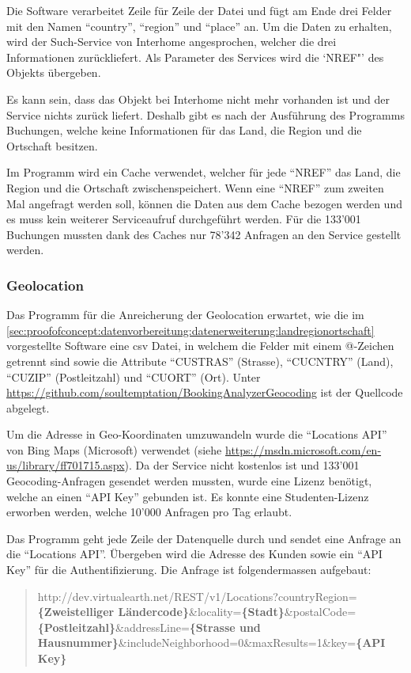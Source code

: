 Die Software verarbeitet Zeile für Zeile der Datei und fügt am Ende drei Felder mit den Namen "`country"', "`region"' und "`place"' an. Um die Daten zu erhalten, wird der Such-Service von Interhome angesprochen, welcher die drei Informationen zurückliefert. Als Parameter des Services wird die `NREF"' des Objekts übergeben. 

Es kann sein, dass das Objekt bei Interhome nicht mehr vorhanden ist und der Service nichts zurück liefert. Deshalb gibt es nach der Ausführung des Programms Buchungen, welche keine Informationen für das Land, die Region und die Ortschaft besitzen.

Im Programm wird ein Cache verwendet, welcher für jede "`NREF"' das Land, die Region und die Ortschaft zwischenspeichert. Wenn eine "`NREF"' zum zweiten Mal angefragt werden soll, können die Daten aus dem Cache bezogen werden und es muss kein weiterer Serviceaufruf durchgeführt werden. Für die 133'001 Buchungen mussten dank des Caches nur 78'342 Anfragen an den Service gestellt werden.

\subsubsection{Geolocation}
\label{sec:proofofconcept:datenvorbereitung:datenerweiterung:geolocation}
Das Programm für die Anreicherung der Geolocation erwartet, wie die im \cref{sec:proofofconcept:datenvorbereitung:datenerweiterung:landregionortschaft} vorgestellte Software eine \gls{csv} Datei, in welchem die Felder mit einem @-Zeichen getrennt sind sowie die Attribute "`CUSTRAS"' (Strasse), "`CUCNTRY"' (Land), "`CUZIP"' (Postleitzahl) und "`CUORT"' (Ort). Unter \url{https://github.com/soultemptation/BookingAnalyzerGeocoding} ist der Quellcode abgelegt. 

Um die Adresse in Geo-Koordinaten umzuwandeln wurde die "`Locations API"' von Bing Maps (Microsoft) verwendet (siehe \url{https://msdn.microsoft.com/en-us/library/ff701715.aspx}). Da der Service nicht kostenlos ist und 133'001 Geocoding-Anfragen gesendet werden mussten, wurde eine Lizenz benötigt, welche an einen "`API Key"' gebunden ist. Es konnte eine Studenten-Lizenz erworben werden, welche 10'000 Anfragen pro Tag erlaubt.

Das Programm geht jede Zeile der Datenquelle durch und sendet eine Anfrage an die "`Locations API"'. Übergeben wird die Adresse des Kunden sowie ein "`API Key"' für die Authentifizierung. Die Anfrage ist folgendermassen aufgebaut:

\blockquote[]{http://dev.virtualearth.net/REST/v1/Locations?countryRegion=\textbf{\{Zweistelliger Ländercode\}}\&locality=\textbf{\{Stadt\}}\&postalCode=\textbf{\{Postleitzahl\}}\&addressLine=\textbf{\{Strasse und Hausnummer\}}\&includeNeighborhood=0\&maxResults=1\&key=\textbf{\{API Key\}}}

